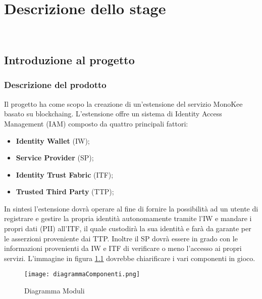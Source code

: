 
\chapter{Descrizione dello stage}
\label{cap:descrizione-stage}

\\

\section{Introduzione al progetto}
\subsection{Descrizione del prodotto}
Il progetto ha come scopo la creazione di un’estensione del servizio MonoKee basato su \gls{blockchaing}. L’estensione offre un sistema di Identity Access Management (IAM) composto da quattro principali fattori:
    \begin{itemize}
        \item \textbf{Identity Wallet} (IW);
        \item \textbf{Service Provider} (SP);
        \item \textbf{Identity Trust Fabric} (ITF);
        \item \textbf{Trusted Third Party} (TTP);
    \end{itemize} 
In sintesi l’estensione dovrà operare al fine di fornire la possibilità ad un utente di registrare e gestire la propria identità autonomamente tramite l’IW e mandare i propri dati (PII) all’ITF, il quale custodirà la sua identità e farà da garante per le asserzioni proveniente dai TTP. Inoltre il SP dovrà essere in grado con le informazioni provenienti da IW e ITF di verificare o meno l’accesso ai propri servizi.
L'immagine in figura \ref{fig:diag-mod} dovrebbe chiarificare i vari componenti in gioco.
\begin{figure}[!h]
    \centering
    \texttt{[image: diagrammaComponenti.png]} 
    \caption{Diagramma Moduli}
    \label{fig:diag-mod} 
\end{figure}
